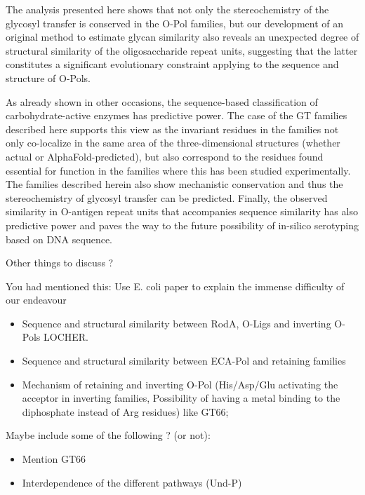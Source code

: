 \documentclass{article}
\begin{document}
The analysis presented here shows that not only the stereochemistry of the glycosyl transfer is conserved in the O-Pol families, but our development of an original method to estimate glycan similarity also reveals an unexpected degree of structural similarity of the oligosaccharide repeat units, suggesting that the latter constitutes a significant evolutionary constraint applying to the sequence and structure of O-Pols. 

As already shown in other occasions, the sequence-based classification of carbohydrate-active enzymes has predictive power. The case of the GT families described here supports this view as the invariant residues in the families not only co-localize in the same area of the three-dimensional structures (whether actual or AlphaFold-predicted), but also correspond to the residues found essential for function in the families where this has been studied experimentally. The families described herein also show mechanistic conservation and thus the stereochemistry of glycosyl transfer can be predicted. Finally, the observed similarity in O-antigen repeat units that accompanies sequence similarity has also predictive power and paves the way to the future possibility of in-silico serotyping based on DNA sequence.


Other things to discuss ?

You had mentioned this: Use E. coli paper to explain the immense difficulty of our endeavour \cite{iguchi_complete_2015}

\begin{itemize}

    \item Sequence and structural similarity between RodA, O-Ligs and inverting O-Pols LOCHER. 
    \item Sequence and structural similarity between ECA-Pol and retaining families
    \item Mechanism of retaining and inverting O-Pol (His/Asp/Glu activating the acceptor in inverting families, Possibility of having a metal binding to the diphosphate instead of Arg residues) like GT66; 

\end{itemize}





Maybe include some of the following ? (or not):
\begin{itemize}
    \item Mention GT66
    \item Interdependence of the different pathways (Und-P) \cite{maczuga_interdependence_2022}
\end{itemize}
\end{document}

